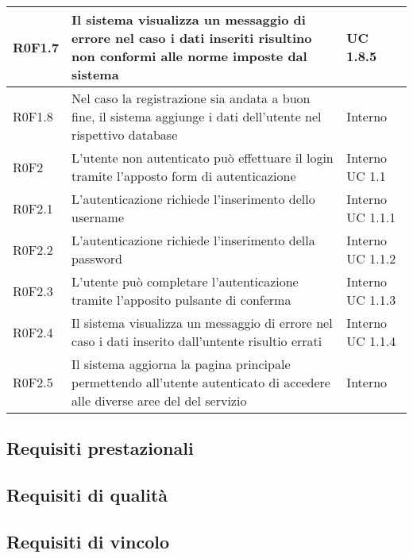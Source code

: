 \begin{center}
\begin{longtable}{| p{2cm} | p{7cm} | p{2cm} |}
		\hline
		R0F1.7  &  Il sistema visualizza un messaggio di errore nel caso i dati inseriti risultino non conformi alle norme imposte dal sistema  &  UC 1.8.5 \\
		\hline
		R0F1.8  &  Nel caso la registrazione sia andata a buon fine, il sistema aggiunge i dati dell'utente nel rispettivo database  &  Interno \\
		\hline
		R0F2  &  L'utente non autenticato può effettuare il login tramite l'apposto form di autenticazione  &  Interno \newline UC 1.1 \\
		\hline
		R0F2.1  &  L'autenticazione richiede l'inserimento dello username  &  Interno \newline UC 1.1.1 \\
		\hline
		R0F2.2  &  L'autenticazione richiede l'inserimento della password  &  Interno \newline UC 1.1.2 \\
		\hline
		R0F2.3  &  L'utente può completare l'autenticazione tramite l'apposito pulsante di conferma  &  Interno \newline UC 1.1.3 \\
		\hline
		R0F2.4  &  Il sistema visualizza un messaggio di errore nel caso i dati inserito dall'untente risultio errati  &  Interno \newline UC 1.1.4 \\
		\hline
		R0F2.5  &  Il sistema aggiorna la pagina principale permettendo all'utente autenticato di accedere alle diverse aree del del servizio  &  Interno  \\
		\hline



	\end{longtable}
	\egroup
\end{center}


\subsection{Requisiti prestazionali}

\subsection{Requisiti di qualità}

\subsection{Requisiti di vincolo}

